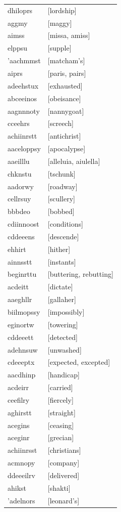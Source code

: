 \documentclass{article}
\begin{document}
\begin{tabular}{ll}
dhiloprs & [lordship] \\
aggmy & [maggy] \\
aimss & [missa, amiss] \\
elppsu & [supple] \\
'aachmmst & [matcham's] \\
aiprs & [paris, pairs] \\
adeehstux & [exhausted] \\
abceeinos & [obeisance] \\
aagnnnoty & [nannygoat] \\
cceehrs & [screech] \\
achiinrstt & [antichrist] \\
aaceloppsy & [apocalypse] \\
aaeilllu & [alleluia, aiulella] \\
chknstu & [tschunk] \\
aadorwy & [roadway] \\
cellrsuy & [scullery] \\
bbbdeo & [bobbed] \\
cdiinnoost & [conditions] \\
cddeeens & [descende] \\
ehhirt & [hither] \\
ainnsstt & [instants] \\
beginrttu & [buttering, rebutting] \\
acdeitt & [dictate] \\
aaeghllr & [gallaher] \\
biilmopssy & [impossibly] \\
eginortw & [towering] \\
cddeeett & [detected] \\
adehnsuw & [unwashed] \\
cdeeeptx & [expected, excepted] \\
aacdhinp & [handicap] \\
acdeirr & [carried] \\
ceefilry & [fiercely] \\
aghirstt & [straight] \\
acegins & [ceasing] \\
aceginr & [grecian] \\
achiinrsst & [christians] \\
acmnopy & [company] \\
ddeeeilrv & [delivered] \\
ahikst & [shakti] \\
'adelnors & [leonard's] \\

\end{tabular}
\end{document}
